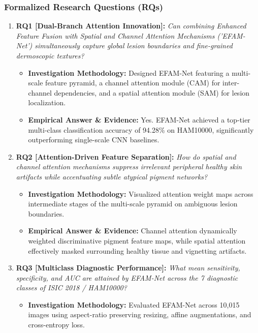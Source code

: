 \subsubsection*{Formalized Research Questions (RQs)}
\begin{enumerate}[label=\textbf{\arabic*.}, leftmargin=*]
  \item \textbf{RQ1 [Dual-Branch Attention Innovation]:} \textit{Can combining Enhanced Feature Fusion with Spatial and Channel Attention Mechanisms ('EFAM-Net') simultaneously capture global lesion boundaries and fine-grained dermoscopic textures?}
  \begin{itemize}[leftmargin=1.5em]
    \item \textbf{Investigation Methodology:} Designed EFAM-Net featuring a multi-scale feature pyramid, a channel attention module (CAM) for inter-channel dependencies, and a spatial attention module (SAM) for lesion localization.
    \item \textbf{Empirical Answer \& Evidence:} Yes. EFAM-Net achieved a top-tier multi-class classification accuracy of 94.28\% on HAM10000, significantly outperforming single-scale CNN baselines.
  \end{itemize}
  \item \textbf{RQ2 [Attention-Driven Feature Separation]:} \textit{How do spatial and channel attention mechanisms suppress irrelevant peripheral healthy skin artifacts while accentuating subtle atypical pigment networks?}
  \begin{itemize}[leftmargin=1.5em]
    \item \textbf{Investigation Methodology:} Visualized attention weight maps across intermediate stages of the multi-scale pyramid on ambiguous lesion boundaries.
    \item \textbf{Empirical Answer \& Evidence:} Channel attention dynamically weighted discriminative pigment feature maps, while spatial attention effectively masked surrounding healthy tissue and vignetting artifacts.
  \end{itemize}
  \item \textbf{RQ3 [Multiclass Diagnostic Performance]:} \textit{What mean sensitivity, specificity, and AUC are attained by EFAM-Net across the 7 diagnostic classes of ISIC 2018 / HAM10000?}
  \begin{itemize}[leftmargin=1.5em]
    \item \textbf{Investigation Methodology:} Evaluated EFAM-Net across 10,015 images using aspect-ratio preserving resizing, affine augmentations, and cross-entropy loss.

\end{itemize}
\end{enumerate}
